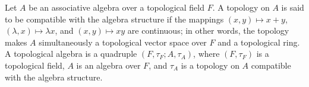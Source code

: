 Let $A$ be an associative algebra over a topological field $F$. A topology on $A$ is said to be compatible with the algebra structure if the mappings $(x, y) \mapsto x + y$, $(\lambda, x) \mapsto \lambda x$, and $(x, y) \mapsto xy$ are continuous; in other words, the topology makes $A$ simultaneously a topological vector space over $F$ and a topological ring. A topological algebra is a quadruple $(F, \tau_F; A, \tau_A)$, where $(F, \tau_F)$ is a topological field, $A$ is an algebra over $F$, and $\tau_A$ is a topology on $A$ compatible with the algebra structure.
